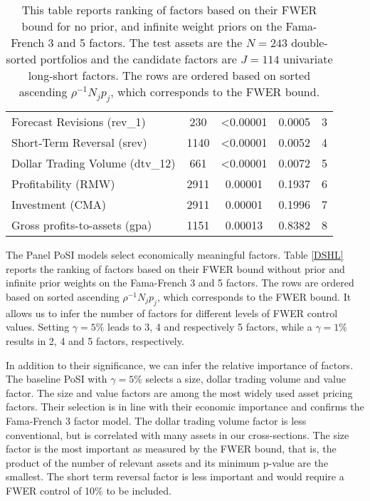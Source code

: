 \documentclass[11pt]{article}
\newcommand\bnotetab[1]{\captionsetup{position=bottom, font=footnotesize,  textfont=normalfont, margin=1mm, skip=2mm, justification=justified, singlelinecheck=false}\caption*{#1}}
\begin{document}
\begin{table}[t!]
\begin{tabular}{l|ccc|c}
		Forecast Revisions (rev\_1)     & 230  & \textless{}0.00001 & 0.0005            & 3 \\
		Short-Term Reversal (srev)      & 1140 & \textless{}0.00001 & 0.0052            & 4 \\
		Dollar Trading Volume (dtv\_12) & 661  & \textless{}0.00001 & 0.0072            & 5 \\
		Profitability (RMW)             & 2911 & 0.00001            & 0.1937            & 6 \\
		Investment (CMA)                & 2911 & 0.00001            & 0.1996            & 7 \\
		Gross profits-to-assets (gpa)   & 1151 & 0.00013            & 0.8382            & 8\\ 
		\bottomrule
	\end{tabular}
	\bnotetab{This table reports ranking of factors based on their FWER bound for no prior, and infinite weight priors on the Fama-French 3 and 5 factors. The test assets are the $N=243$ double-sorted portfolios and the candidate factors are $J=114$ univariate long-short factors. The rows are ordered based on sorted ascending $\rho^{-1} N_jp_j$, which corresponds to the FWER bound.}
\end{table}





The Panel PoSI models select economically meaningful factors. Table \ref{DSHL} reports the ranking of factors based on their FWER bound without prior and infinite prior weights on the Fama-French 3 and 5 factors. The rows are ordered based on sorted ascending $\rho^{-1} N_jp_j$, which corresponds to the FWER bound. It allows us to infer the number of factors for different levels of FWER control values. Setting $\gamma=5\%$ leads to 3, 4 and respectively 5 factors, while a $\gamma=1\%$ results in 2, 4 and 5 factors, respectively. 

In addition to their significance, we can infer the relative importance of factors. The baseline PoSI with $\gamma=5\%$ selects a size, dollar trading volume and value factor. The size and value factors are among the most widely used asset pricing factors. Their selection is in line with their economic importance and confirms the Fama-French 3 factor model. The dollar trading volume factor is less conventional, but is correlated with many assets in our cross-sections. The size factor is the most important as measured by the FWER bound, that is, the product of the number of relevant assets and its minimum p-value are the smallest. The short term reversal factor is less important and would require a FWER control of 10\% to be included.
\end{document}
